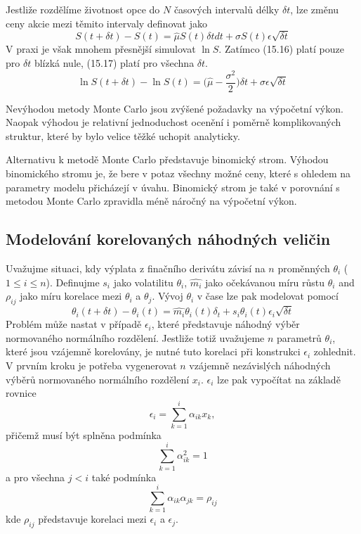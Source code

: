 \documentclass[a4paper]{book}
\begin{document}
Jestliže rozdělíme životnost opce do $N$ časových intervalů délky $\delta t$, lze změnu ceny akcie mezi těmito intervaly definovat jako
\begin{equation}
S(t+\delta t)-S(t)= \hat{\mu} S(t)\delta t dt + \sigma S(t) \epsilon \sqrt{\delta t} 
\end{equation}
V praxi je však mnohem přesnější simulovat $\ln S$. Zatímco (15.16) platí pouze pro $\delta t$ blízká nule, (15.17) platí pro všechna $\delta t$.
\begin{equation}
\ln S(t+\delta t)- \ln S(t)= \big(\hat{\mu} - \frac{\sigma^2}{2} \big) \delta t + \sigma \epsilon \sqrt{\delta t}
\end{equation}

Nevýhodou metody Monte Carlo jsou zvýšené požadavky na výpočetní výkon. Naopak výhodou je relativní jednoduchost ocenění i poměrně komplikovaných struktur, které by bylo velice těžké uchopit analyticky.

Alternativu k metodě Monte Carlo představuje binomický strom. Výhodou binomického stromu je, že bere v potaz všechny možné ceny, které s ohledem na parametry modelu přicházejí v úvahu. Binomický strom je také v porovnání s metodou Monte Carlo zpravidla méně náročný na výpočetní výkon.

\subsection{Modelování korelovaných náhodných veličin}

Uvažujme situaci, kdy výplata z finačního derivátu závisí na $n$ proměnných $\theta_i$ ($1 \le i \le n$). Definujme $s_i$ jako volatilitu $\theta_i$, $\hat{m_i}$ jako očekávanou míru růstu $\theta_i$ and $\rho_{ij}$ jako míru korelace mezi $\theta_i$ a $\theta_j$. Vývoj $\theta_i$ v čase lze pak modelovat pomocí
\begin{equation*}
\theta_i(t + \delta t) - \theta_i(t) = \hat{m_i}\theta_i(t)\delta_t + s_i\theta_i(t)\epsilon_i\sqrt{\delta t}
\end{equation*}
Problém může nastat v případě $\epsilon_i$, které představuje náhodný výběr normovaného normálního rozdělení. Jestliže totiž uvažujeme $n$ parametrů $\theta_i$, které jsou vzájemně korelovány, je nutné tuto korelaci při konstrukci $\epsilon_i$ zohlednit. V prvním kroku je potřeba vygenerovat $n$ vzájemně nezávislých náhodných výběrů normovaného normálního rozdělení $x_i$. $\epsilon_i$ lze pak vypočítat na základě rovnice
\begin{equation}
\epsilon_i = \sum_{k=1}^i \alpha_{ik}x_k,
\end{equation}
přičemž musí být splněna podmínka
\begin{equation}
\sum_{k=1}^i \alpha_{ik}^2 = 1
\end{equation}
a pro všechna $j < i$ také podmínka
\begin{equation}
\sum_{k=1}^i \alpha_{ik} \alpha_{jk}=\rho_{ij}
\end{equation}
kde $\rho_{ij}$ představuje korelaci mezi $\epsilon_i$ a $\epsilon_j$.
\end{document}
